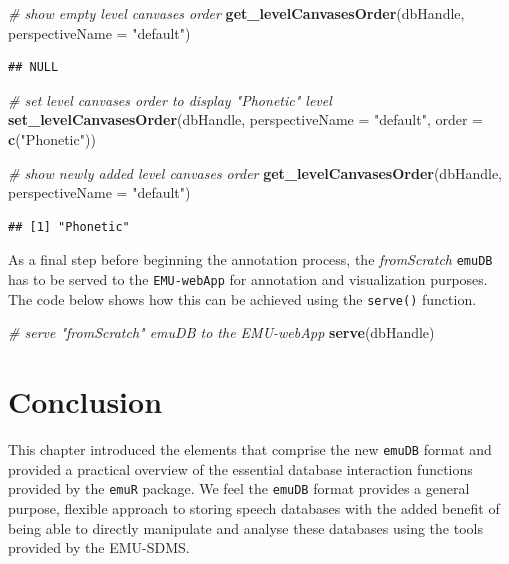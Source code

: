 \documentclass[]{book}
\newenvironment{Shaded}{\begin{snugshade}}{\end{snugshade}}
\newcommand{\CommentTok}[1]{\textcolor[rgb]{0.56,0.35,0.01}{\textit{#1}}}
\newcommand{\DataTypeTok}[1]{\textcolor[rgb]{0.13,0.29,0.53}{#1}}
\newcommand{\KeywordTok}[1]{\textcolor[rgb]{0.13,0.29,0.53}{\textbf{#1}}}
\newcommand{\NormalTok}[1]{#1}
\newcommand{\StringTok}[1]{\textcolor[rgb]{0.31,0.60,0.02}{#1}}
\begin{document}
\begin{Shaded}
\begin{Highlighting}[]
\CommentTok{# show empty level canvases order}
\KeywordTok{get_levelCanvasesOrder}\NormalTok{(dbHandle, }\DataTypeTok{perspectiveName =} \StringTok{"default"}\NormalTok{)}
\end{Highlighting}
\end{Shaded}

\begin{verbatim}
## NULL
\end{verbatim}

\begin{Shaded}
\begin{Highlighting}[]
\CommentTok{# set level canvases order to display "Phonetic" level}
\KeywordTok{set_levelCanvasesOrder}\NormalTok{(dbHandle,}
                       \DataTypeTok{perspectiveName =} \StringTok{"default"}\NormalTok{,}
                       \DataTypeTok{order =} \KeywordTok{c}\NormalTok{(}\StringTok{"Phonetic"}\NormalTok{))}

\CommentTok{# show newly added level canvases order}
\KeywordTok{get_levelCanvasesOrder}\NormalTok{(dbHandle, }\DataTypeTok{perspectiveName =} \StringTok{"default"}\NormalTok{)}
\end{Highlighting}
\end{Shaded}

\begin{verbatim}
## [1] "Phonetic"
\end{verbatim}

As a final step before beginning the annotation process, the \emph{fromScratch} \texttt{emuDB} has to be served to the \texttt{EMU-webApp} for annotation and visualization purposes. The code below shows how this can be achieved using the \texttt{serve()} function.

\begin{Shaded}
\begin{Highlighting}[]
\CommentTok{# serve "fromScratch" emuDB to the EMU-webApp}
\KeywordTok{serve}\NormalTok{(dbHandle)}
\end{Highlighting}
\end{Shaded}

\hypertarget{conclusion-2}{%
\section{Conclusion}\label{conclusion-2}}

This chapter introduced the elements that comprise the new \texttt{emuDB} format and provided a practical overview of the essential database interaction functions provided by the \texttt{emuR} package. We feel the \texttt{emuDB} format provides a general purpose, flexible approach to storing speech databases with the added benefit of being able to directly manipulate and analyse these databases using the tools provided by the EMU-SDMS.
\end{document}
